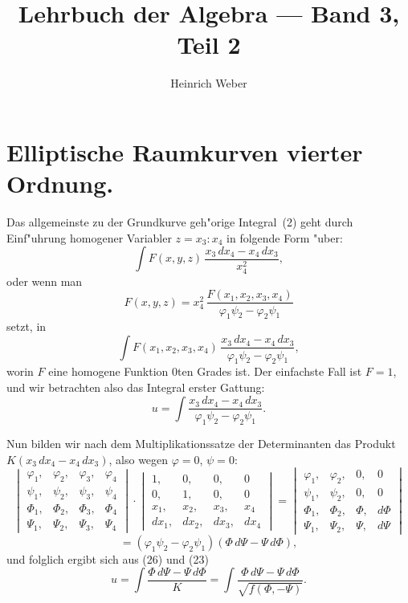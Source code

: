 \documentclass[12pt,a4paper]{article}
\title{Lehrbuch der Algebra --- Band 3, Teil 2}
\author{Heinrich Weber}
\date{}
\theoremstyle{definition}
\begin{document}
\maketitle
\thispagestyle{empty}

\setcounter{section}{6}

\section{Elliptische Raumkurven vierter Ordnung.}

Das allgemeinste zu der Grundkurve geh"orige Integral~(2) geht durch Einf"uhrung homogener Variabler $z = x_3:x_4$ in folgende Form "uber:
\[
\int F(x,y,z)\,\frac{x_3\,dx_4 - x_4\,dx_3}{x_4^2},
\]
oder wenn man
\[
F(x,y,z) = x_4^2\,\frac{F(x_1,x_2,x_3,x_4)}{\varphi_1\psi_2 - \varphi_2\psi_1}
\]
setzt, in
\[
\int F(x_1,x_2,x_3,x_4)\,\frac{x_3\,dx_4 - x_4\,dx_3}{\varphi_1\psi_2 - \varphi_2\psi_1},
\]
worin $F$ eine homogene Funktion $0$ten Grades ist. Der einfachste Fall ist $F = 1$, und wir betrachten also das Integral erster Gattung:
\begin{equation}\tag{26}
u = \int\frac{x_3\,dx_4 - x_4\,dx_3}{\varphi_1\psi_2 - \varphi_2\psi_1}.
\end{equation}

Nun bilden wir nach dem Multiplikationssatze der Determinanten das Produkt $K(x_3\,dx_4 - x_4\,dx_3)$, also wegen $\varphi = 0$, $\psi = 0$:
\[
\begin{vmatrix}
\varphi_1, & \varphi_2, & \varphi_3, & \varphi_4 \\
\psi_1, & \psi_2, & \psi_3, & \psi_4 \\
\Phi_1, & \Phi_2, & \Phi_3, & \Phi_4 \\
\Psi_1, & \Psi_2, & \Psi_3, & \Psi_4
\end{vmatrix}
\cdot
\begin{vmatrix}
1, & 0, & 0, & 0 \\
0, & 1, & 0, & 0 \\
x_1, & x_2, & x_3, & x_4 \\
dx_1, & dx_2, & dx_3, & dx_4
\end{vmatrix}
=
\begin{vmatrix}
\varphi_1, & \varphi_2, & 0, & 0 \\
\psi_1, & \psi_2, & 0, & 0 \\
\Phi_1, & \Phi_2, & \Phi, & d\Phi \\
\Psi_1, & \Psi_2, & \Psi, & d\Psi
\end{vmatrix}
\]
\[
= (\varphi_1\psi_2 - \varphi_2\psi_1)(\Phi\,d\Psi - \Psi\,d\Phi),
\]
und folglich ergibt sich aus (26) und (23)
\begin{equation}\tag{27}
u = \int\frac{\Phi\,d\Psi - \Psi\,d\Phi}{K} = \int\frac{\Phi\,d\Psi - \Psi\,d\Phi}{\sqrt{f(\Phi,-\Psi)}}.
\end{equation}
\end{document}
